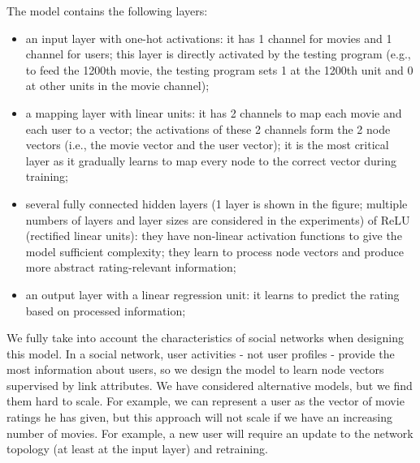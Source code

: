 \documentclass[twocolumn]{article}
\begin{document}
The model contains the following layers:
\begin{itemize}
	\item an input layer with one-hot activations: it has 1 channel for movies 
	and 1 channel for users;
	this layer is directly activated by the testing program (e.g., to feed the 
	1200th movie, the testing program sets 1 at the 1200th unit and 0 at other 	
	units in the movie channel);
	\item a mapping layer with linear units: it has 2 channels to map each 
	movie and each user to a vector;
	the activations of these 2 channels form the 2 node vectors (i.e., the 
	movie vector and the user vector);
	it is the most critical layer as it gradually learns to map every node to 
	the correct vector during training;
	\item several fully connected hidden layers (1 layer is shown in the figure;
	multiple numbers of layers and layer sizes are considered in the 
	experiments) of ReLU (rectified linear units):
	they have non-linear activation functions to give the model sufficient 
	complexity;
	they learn to process node vectors and produce more abstract 
	rating-relevant information;
	\item an output layer with a linear regression unit: it learns to predict 
	the rating based on processed information;
\end{itemize}
We fully take into account the characteristics of social networks when 
designing this model.
In a social network, user activities - not user profiles - provide the most 
information about users, so we design the model to learn node vectors 
supervised by link attributes.
We have considered alternative models, but we find them hard to scale.
For example, we can represent a user as the vector of movie ratings he has 
given, 
but this approach will not scale if we have an increasing number of movies.
For example, a new user will require an update to the network topology (at 
least at the input layer) and retraining.
\end{document}
